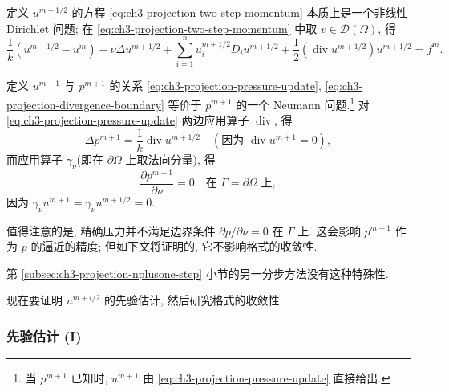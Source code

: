 \begin{Remark}
\label{rem:ch3-projection-dirichlet-step}
定义 $u^{m+1/2}$ 的方程 \eqref{eq:ch3-projection-two-step-momentum} 本质上是一个非线性 Dirichlet 问题; 在 \eqref{eq:ch3-projection-two-step-momentum} 中取 $v\in\mathcal D(\Omega)$, 得
\begin{equation}
\frac1k(u^{m+1/2}-u^m)-\nu\Delta u^{m+1/2}
+\sum_{i=1}^n u_i^{m+1/2}D_i u^{m+1/2}
+\frac12(\operatorname{div}u^{m+1/2})u^{m+1/2}=f^m.
\label{eq:ch3-projection-dirichlet-form}
\end{equation}
\end{Remark}

\begin{Remark}
\label{rem:ch3-projection-neumann-pressure}
定义 $u^{m+1}$ 与 $p^{m+1}$ 的关系 \eqref{eq:ch3-projection-pressure-update}, \eqref{eq:ch3-projection-divergence-boundary} 等价于 $p^{m+1}$ 的一个 Neumann 问题.\footnote{当 $p^{m+1}$ 已知时, $u^{m+1}$ 由 \eqref{eq:ch3-projection-pressure-update} 直接给出.} 对 \eqref{eq:ch3-projection-pressure-update} 两边应用算子 $\operatorname{div}$, 得
\begin{equation}
\Delta p^{m+1}=\frac1k\operatorname{div}u^{m+1/2}
\quad(\text{因为 }\operatorname{div}u^{m+1}=0),
\label{eq:ch3-projection-pressure-poisson}
\end{equation}
而应用算子 $\gamma_\nu$(即在 $\partial\Omega$ 上取法向分量), 得
\begin{equation}
\frac{\partial p^{m+1}}{\partial\nu}=0
\quad\text{在 }\Gamma=\partial\Omega\text{ 上},
\label{eq:ch3-projection-pressure-neumann}
\end{equation}
因为 $\gamma_\nu u^{m+1}=\gamma_\nu u^{m+1/2}=0$.

值得注意的是, 精确压力并不满足边界条件 $\partial p/\partial\nu=0$ 在 $\Gamma$ 上. 这会影响 $p^{m+1}$ 作为 $p$ 的逼近的精度; 但如下文将证明的, 它不影响格式的收敛性.

第 \ref{subsec:ch3-projection-nplusone-step} 小节的另一分步方法没有这种特殊性.
\end{Remark}

现在要证明 $u^{m+i/2}$ 的先验估计, 然后研究格式的收敛性.

\hypertarget{chapter-03-page-285}{}
\subsubsection{先验估计 (I)}
\label{subsubsec:ch3-projection-apriori-one}

